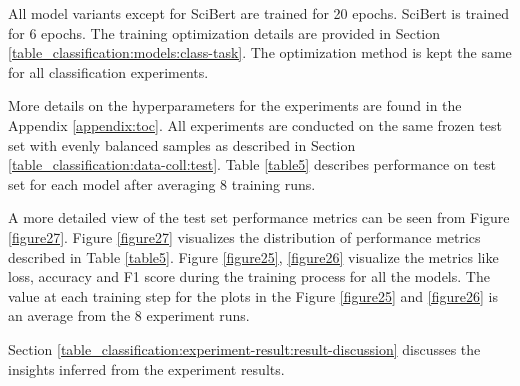 All model variants except for SciBert are trained for 20 epochs. SciBert is trained for 6 epochs. The training optimization details are provided in Section \ref{table_classification:models:class-task}. The optimization method is kept the same for all classification experiments. 

More details on the hyperparameters for the experiments are found in the Appendix \ref{appendix:toc}. All experiments are conducted on the same frozen test set with evenly balanced samples as described in Section \ref{table_classification:data-coll:test}. Table \ref{table5} describes performance on test set for each model after averaging 8 training runs.

A more detailed view of the test set performance metrics can be seen from Figure \ref{figure27}. Figure \ref{figure27} visualizes the distribution of performance metrics described in Table \ref{table5}. Figure \ref{figure25}, \ref{figure26} visualize the metrics like loss, accuracy and F1 score during the training process for all the models. The value at each training step for the plots in the Figure \ref{figure25} and \ref{figure26} is an average from the 8 experiment runs.

Section \ref{table_classification:experiment-result:result-discussion} discusses the insights inferred from the experiment results. 


